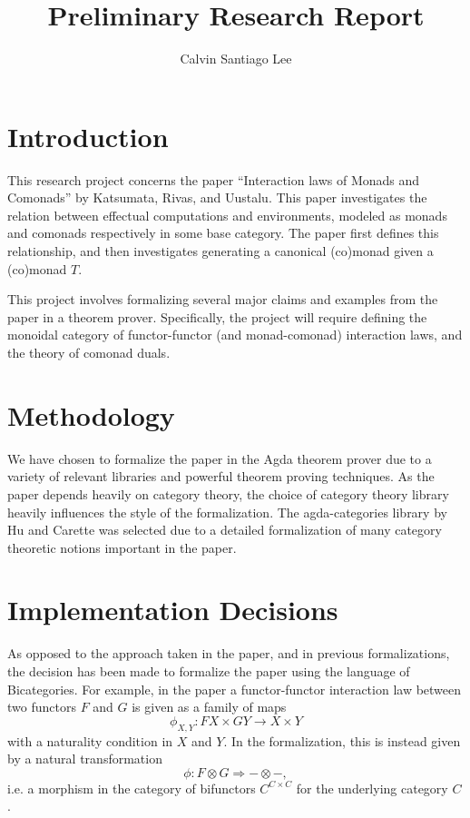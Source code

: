\documentclass{amsart}
\title{Preliminary Research Report}
\author{Calvin Santiago Lee}
\theoremstyle{remark}
\begin{document}
\maketitle
\tableofcontents
\section{Introduction}

This research project concerns the paper ``Interaction laws of Monads and Comonads'' by Katsumata, Rivas, and Uustalu\cite{monads-comonads}. This paper investigates the relation between effectual computations  and environments, modeled as monads and comonads respectively in some base category. The paper first defines this relationship, and then investigates generating a canonical (co)monad given a (co)monad $T$.

This project involves formalizing several major claims and examples from the paper in a theorem prover. Specifically, the project will require defining the monoidal category of functor-functor (and monad-comonad) interaction laws, and the theory of comonad duals.

\section{Methodology}
We have chosen to formalize the paper in the Agda\cite{agda} theorem prover due to a variety of relevant libraries and powerful theorem proving techniques. As the paper depends heavily on category theory, the choice of category theory library heavily influences the style of the formalization. The agda-categories\cite{agda:categories} library by Hu and Carette was selected due to a detailed formalization of many category theoretic notions important in the paper.

\section{Implementation Decisions}
As opposed to the approach taken in the paper, and in previous formalizations, the decision has been made to formalize the paper using the language of Bicategories\cite{nlab:bicategory}. For example, in the paper a functor-functor interaction law between two functors $F$ and $G$ is given as a family of maps 
\[\phi_{X,Y}\colon F X \times GY \to X \times Y\]
with a naturality condition in $X$ and $Y$.
In the formalization, this is instead given by a natural transformation \[\phi \colon F \otimes G \Rightarrow -\otimes -,\]
i.e. a morphism in the category of bifunctors \(C^{C\times C}\) for the underlying category $C$.
\end{document}
